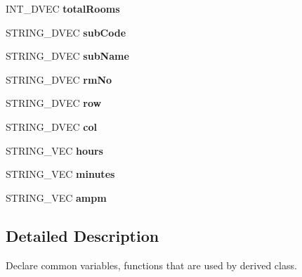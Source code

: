 \begin{DoxyCompactItemize}
\item 
\hypertarget{classInputDetail_ae47ff085393d9555ae7c080759a7dae7}{I\-N\-T\-\_\-D\-V\-E\-C {\bfseries total\-Rooms}}\label{classInputDetail_ae47ff085393d9555ae7c080759a7dae7}

\item 
\hypertarget{classInputDetail_a375eb1fe30c29f80a2020dd63c173428}{S\-T\-R\-I\-N\-G\-\_\-D\-V\-E\-C {\bfseries sub\-Code}}\label{classInputDetail_a375eb1fe30c29f80a2020dd63c173428}

\item 
\hypertarget{classInputDetail_ad5279168818a6af3578a0f70e4be195d}{S\-T\-R\-I\-N\-G\-\_\-D\-V\-E\-C {\bfseries sub\-Name}}\label{classInputDetail_ad5279168818a6af3578a0f70e4be195d}

\item 
\hypertarget{classInputDetail_a01a2dbec27704527002029a9ed8bb35f}{S\-T\-R\-I\-N\-G\-\_\-D\-V\-E\-C {\bfseries rm\-No}}\label{classInputDetail_a01a2dbec27704527002029a9ed8bb35f}

\item 
\hypertarget{classInputDetail_a2ecfc489098c98cf26d22ca422572a0f}{S\-T\-R\-I\-N\-G\-\_\-D\-V\-E\-C {\bfseries row}}\label{classInputDetail_a2ecfc489098c98cf26d22ca422572a0f}

\item 
\hypertarget{classInputDetail_a7d61822dbecef7d625efc05d7ab6bd30}{S\-T\-R\-I\-N\-G\-\_\-D\-V\-E\-C {\bfseries col}}\label{classInputDetail_a7d61822dbecef7d625efc05d7ab6bd30}

\item 
\hypertarget{classInputDetail_a04f56832f80cc0bee7bdba684021a7a7}{S\-T\-R\-I\-N\-G\-\_\-\-V\-E\-C {\bfseries hours}}\label{classInputDetail_a04f56832f80cc0bee7bdba684021a7a7}

\item 
\hypertarget{classInputDetail_a57361640f5fb45f680771c135eccbb16}{S\-T\-R\-I\-N\-G\-\_\-\-V\-E\-C {\bfseries minutes}}\label{classInputDetail_a57361640f5fb45f680771c135eccbb16}

\item 
\hypertarget{classInputDetail_ab308f31066a7be5513bd59bdcdbd9066}{S\-T\-R\-I\-N\-G\-\_\-\-V\-E\-C {\bfseries ampm}}\label{classInputDetail_ab308f31066a7be5513bd59bdcdbd9066}

\end{DoxyCompactItemize}


\subsection{Detailed Description}
Declare common variables, functions that are used by derived class. 

